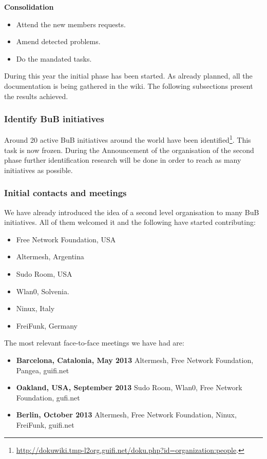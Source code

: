 \textbf{Consolidation}
\begin{itemize}
  \setlength{\itemindent}{2em}
  \item Attend the new members requests.
  \item Amend detected problems.
  \item Do the mandated tasks.
\end{itemize}

During this year the initial phase has been started. As already planned, all the documentation is being gathered in the wiki. The following subsections present the results achieved.

\subsubsection{Identify BuB initiatives}
Around 20 active BuB initiatives around the world have been identified\footnote{\url{http://dokuwiki.tmp-l2org.guifi.net/doku.php?id=organization:people}.}. This task is now frozen. During the Announcement of the organisation of the second phase further identification research will be done in order to reach as many initiatives as possible.


\subsubsection{Initial contacts and meetings}
We have already introduced the idea of a second level organisation to many BuB initiatives. All of them welcomed it and the following have started contributing:
\begin{itemize}
  \setlength{\itemindent}{2em}
  \item Free Network Foundation, USA
  \item Altermesh, Argentina
  \item Sudo Room, USA
  \item Wlan0, Solvenia.
  \item Ninux, Italy
  \item FreiFunk, Germany
\end{itemize}

The most relevant face-to-face meetings we have had are:
\begin{itemize}
  \setlength{\itemindent}{2em}
  \item \textbf{Barcelona, Catalonia, May 2013} Altermesh, Free Network Foundation, Pangea, guifi.net
  \item \textbf{Oakland, USA, September 2013} Sudo Room, Wlan0, Free Network Foundation, gufi.net
  \item \textbf{Berlin, October 2013} Altermesh, Free Network Foundation, Ninux, FreiFunk, guifi.net
\end{itemize}

